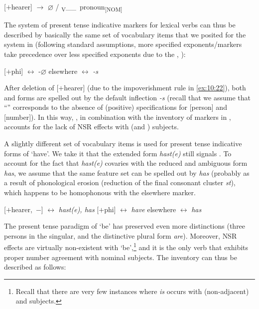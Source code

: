 \documentclass[output=paper]{langsci/langscibook}
\begin{document}
\ea\label{ex:10:22}
\mbox{[$+$hearer]} {$\rightarrow$ $\varnothing$} / \textsubscript{V}\_\_\ pronoun\textsubscript{[NOM]}
\z

The system of present tense indicative markers for lexical verbs can thus be
described by basically the same set of vocabulary items that we posited for the
system in  (following standard assumptions, more
specified exponents/markers take precedence over less specified exponents due
to the , \citealt{Kiparsky:1973}):

\ea \label{ex:10:23}
\ea \mbox{[$+$phi]} $\leftrightarrow$ -$\varnothing$
\ex elsewhere $\leftrightarrow$ \emph{-s}
\z
\z

After deletion of [$+$hearer] (due to the impoverishment rule in \ref{ex:10:22}), both
\Ssg{} and \Tsg{} forms are spelled out by the default inflection \emph{-s}
(recall that we assume that ``\Tsg{}'' corresponds to the absence of (positive)
specifications for [person] and [number]). In this way, , in combination
with the inventory of  markers in , accounts for the lack of
\gls{NSR} effects with \Ssg{} (and \Tsg{}) subjects.

A slightly different set of vocabulary items is used for present tense
indicative forms of `have'. We take it that the extended form \emph{hast(e)}
still signals \Ssg{}. To account for the fact that \emph{hast(e)} covaries with
the reduced and ambiguous form \emph{has}, we assume that the same feature set
can be spelled out by \emph{has} (probably as a result of phonological erosion
(reduction of the final consonant cluster \emph{st}), which happens to be
homophonous with the elsewhere marker.

\ea
\ea \mbox{[$+$hearer, $-$\Pl]} $\leftrightarrow$ \emph{hast(e), has}
\ex \mbox{[$+$phi]} $\leftrightarrow$ \emph{have}
\ex elsewhere $\leftrightarrow$ \emph{has}
\z
\z

The present tense paradigm of `be' has preserved even more distinctions (three
persons in the singular, and the distinctive plural form \emph{are}). Moreover,
\gls{NSR} effects are virtually non-existent with `be',\footnote{Recall that
    there are very few instances where \emph{is} occurs with (non-adjacent)
    \Fsg{} and \Ssg{} subjects.} and it is the only verb that exhibits proper
    number agreement with nominal subjects. The
    inventory can thus be described as follows:
\end{document}

